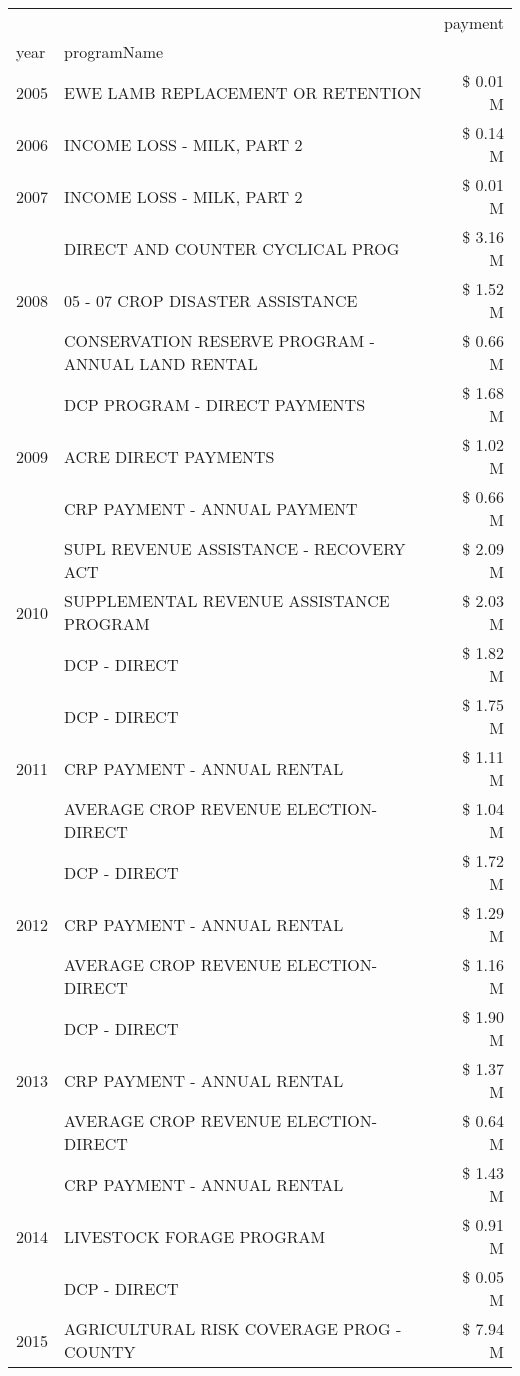 \begin{tabular}{llr}
\toprule
 &  & payment \\
year & programName &  \\
\midrule
2005 & EWE LAMB REPLACEMENT OR RETENTION & \$ 0.01 M \\
\cline{1-3}
2006 & INCOME LOSS - MILK, PART 2 & \$ 0.14 M \\
\cline{1-3}
2007 & INCOME LOSS - MILK, PART 2 & \$ 0.01 M \\
\cline{1-3}
\multirow[t]{3}{*}{2008} & DIRECT AND COUNTER CYCLICAL PROG & \$ 3.16 M \\
 & 05 - 07 CROP DISASTER ASSISTANCE & \$ 1.52 M \\
 & CONSERVATION RESERVE PROGRAM - ANNUAL LAND RENTAL & \$ 0.66 M \\
\cline{1-3}
\multirow[t]{3}{*}{2009} & DCP PROGRAM - DIRECT PAYMENTS & \$ 1.68 M \\
 & ACRE DIRECT PAYMENTS & \$ 1.02 M \\
 & CRP PAYMENT - ANNUAL PAYMENT & \$ 0.66 M \\
\cline{1-3}
\multirow[t]{3}{*}{2010} & SUPL REVENUE ASSISTANCE - RECOVERY ACT & \$ 2.09 M \\
 & SUPPLEMENTAL REVENUE ASSISTANCE PROGRAM & \$ 2.03 M \\
 & DCP - DIRECT & \$ 1.82 M \\
\cline{1-3}
\multirow[t]{3}{*}{2011} & DCP - DIRECT & \$ 1.75 M \\
 & CRP PAYMENT - ANNUAL RENTAL & \$ 1.11 M \\
 & AVERAGE CROP REVENUE ELECTION-DIRECT & \$ 1.04 M \\
\cline{1-3}
\multirow[t]{3}{*}{2012} & DCP - DIRECT & \$ 1.72 M \\
 & CRP PAYMENT - ANNUAL RENTAL & \$ 1.29 M \\
 & AVERAGE CROP REVENUE ELECTION-DIRECT & \$ 1.16 M \\
\cline{1-3}
\multirow[t]{3}{*}{2013} & DCP - DIRECT & \$ 1.90 M \\
 & CRP PAYMENT - ANNUAL RENTAL & \$ 1.37 M \\
 & AVERAGE CROP REVENUE ELECTION-DIRECT & \$ 0.64 M \\
\cline{1-3}
\multirow[t]{3}{*}{2014} & CRP PAYMENT - ANNUAL RENTAL & \$ 1.43 M \\
 & LIVESTOCK FORAGE PROGRAM & \$ 0.91 M \\
 & DCP - DIRECT & \$ 0.05 M \\
\cline{1-3}
\multirow[t]{3}{*}{2015} & AGRICULTURAL RISK COVERAGE PROG - COUNTY & \$ 7.94 M \\

\end{tabular}
